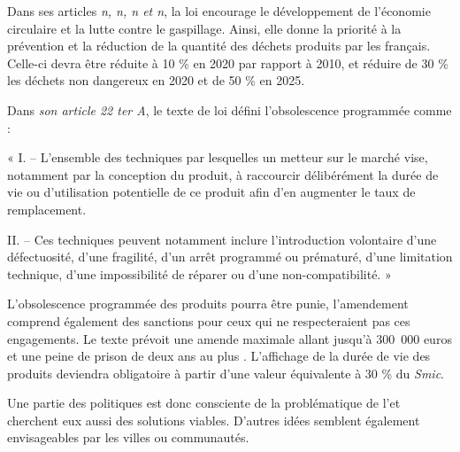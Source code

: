 \bigbreak
Dans ses articles \textit{n, n, n et n}, la loi encourage le développement de l’économie circulaire et la lutte contre le gaspillage. Ainsi, elle donne la priorité à la prévention et la réduction de la quantité des déchets produits par les français. Celle-ci devra être réduite à 10 \%  en 2020 par rapport à 2010, et réduire de 30 \% les déchets non dangereux en 2020 et de 50 \% en 2025.


\bigbreak
Dans \textit{son article 22 ter A}, le texte de loi défini l’obsolescence programmée comme :

\begin{itshape}« I. – L’ensemble des techniques par lesquelles un metteur sur le marché vise, notamment par la conception du produit, à raccourcir délibérément la durée de vie ou d’utilisation potentielle de ce produit afin d’en augmenter le taux de remplacement.

II. – Ces techniques peuvent notamment inclure l’introduction volontaire d’une défectuosité, d’une fragilité, d’un arrêt programmé ou prématuré, d’une limitation technique, d’une impossibilité de réparer ou d’une non-compatibilité. »
\end{itshape}

\bigbreak
L’obsolescence programmée des produits pourra être punie, l’amendement comprend également des sanctions pour ceux qui ne respecteraient pas ces engagements. Le texte prévoit une amende maximale allant jusqu'à 300~000 euros et une peine de prison de deux ans au plus \cite{sanctionloi}. L'affichage de la durée de vie des produits deviendra obligatoire à partir d'une valeur équivalente à 30 \% du \textit{Smic}.


Une partie des politiques est donc consciente de la problématique de l'\op et cherchent eux aussi des solutions viables. D'autres idées semblent également envisageables par les villes ou communautés.